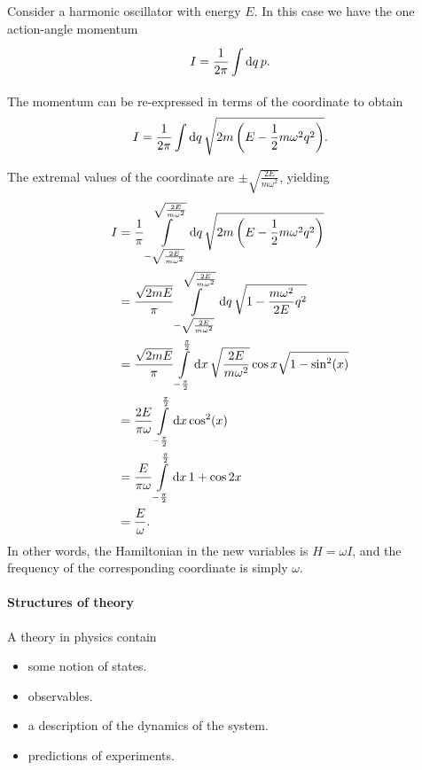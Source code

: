 Consider a harmonic oscillator with energy $E$. In this case we have the one action-angle momentum
\begin{align*}
	I = \frac{1}{2\pi}\int\limits_{}^{}\dd{q}{p}.
\end{align*}
The momentum can be re-expressed in terms of the coordinate to obtain
\begin{align*}
	I = \frac{1}{2\pi}\int\limits_{}^{}\dd{q}{\sqrt{2m\left(E - \frac{1}{2}m\omega^{2}q^{2}\right)}}.
\end{align*}
The extremal values of the coordinate are $\pm\sqrt{\frac{2E}{m\omega^{2}}}$, yielding
\begin{align*}
	I &= \frac{1}{\pi}\int\limits_{-\sqrt{\frac{2E}{m\omega^{2}}}}^{\sqrt{\frac{2E}{m\omega^{2}}}}\dd{q}{\sqrt{2m\left(E - \frac{1}{2}m\omega^{2}q^{2}\right)}} \\
	  &= \frac{\sqrt{2mE}}{\pi}\int\limits_{-\sqrt{\frac{2E}{m\omega^{2}}}}^{\sqrt{\frac{2E}{m\omega^{2}}}}\dd{q}{\sqrt{1 - \frac{m\omega^{2}}{2E}q^{2}}} \\
	  &= \frac{\sqrt{2mE}}{\pi}\int\limits_{-\frac{\pi}{2}}^{\frac{\pi}{2}}\dd{x}{\sqrt{\frac{2E}{m\omega^{2}}}\cos{x}\sqrt{1 - \sin[2](x)}} \\
	  &= \frac{2E}{\pi\omega}\int\limits_{-\frac{\pi}{2}}^{\frac{\pi}{2}}\dd{x}{\cos[2](x)} \\
	  &= \frac{E}{\pi\omega}\int\limits_{-\frac{\pi}{2}}^{\frac{\pi}{2}}\dd{x}{1 + \cos{2x}} \\
	  &= \frac{E}{\omega}.
\end{align*}
In other words, the Hamiltonian in the new variables is $H = \omega I$, and the frequency of the corresponding coordinate is simply $\omega$.

\paragraph{Structures of theory}
A theory in physics contain
\begin{itemize}
	\item some notion of states.
	\item observables.
	\item a description of the dynamics of the system.
	\item predictions of experiments.
\end{itemize}

